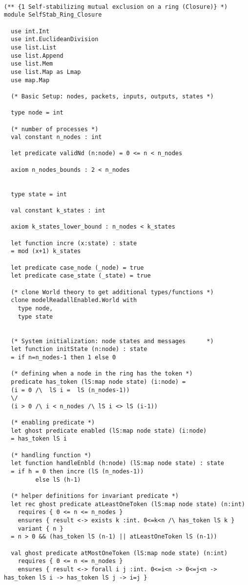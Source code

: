 \documentclass[11pt]{article}
\begin{document}
\begin{verbatim}

(** {1 Self-stabilizing mutual exclusion on a ring (Closure)} *)
module SelfStab_Ring_Closure

  use int.Int
  use int.EuclideanDivision
  use list.List
  use list.Append
  use list.Mem
  use list.Map as Lmap
  use map.Map

  (* Basic Setup: nodes, packets, inputs, outputs, states *)

  type node = int

  (* number of processes *)
  val constant n_nodes : int

  let predicate validNd (n:node) = 0 <= n < n_nodes

  axiom n_nodes_bounds : 2 < n_nodes


  type state = int

  val constant k_states : int

  axiom k_states_lower_bound : n_nodes < k_states

  let function incre (x:state) : state
  = mod (x+1) k_states

  let predicate case_node (_node) = true
  let predicate case_state (_state) = true

  (* clone World theory to get additional types/functions *)
  clone modelReadallEnabled.World with
    type node,
    type state


  (* System initialization: node states and messages      *)
  let function initState (n:node) : state
  = if n=n_nodes-1 then 1 else 0

  (* defining when a node in the ring has the token *)
  predicate has_token (lS:map node state) (i:node) =
  (i = 0 /\  lS i =  lS (n_nodes-1))
  \/
  (i > 0 /\ i < n_nodes /\ lS i <> lS (i-1))

  (* enabling predicate *)
  let ghost predicate enabled (lS:map node state) (i:node)
  = has_token lS i

  (* handling function *)
  let function handleEnbld (h:node) (lS:map node state) : state
  = if h = 0 then incre (lS (n_nodes-1))
	     else lS (h-1)

  (* helper definitions for invariant predicate *)
  let rec ghost predicate atLeastOneToken (lS:map node state) (n:int)
    requires { 0 <= n <= n_nodes }
    ensures { result <-> exists k :int. 0<=k<n /\ has_token lS k }
    variant { n }
  = n > 0 && (has_token lS (n-1) || atLeastOneToken lS (n-1))

  val ghost predicate atMostOneToken (lS:map node state) (n:int)
    requires { 0 <= n <= n_nodes }
    ensures { result <-> forall i j :int. 0<=i<n -> 0<=j<n -> has_token lS i -> has_token lS j -> i=j }



\end{verbatim}
\end{document}
